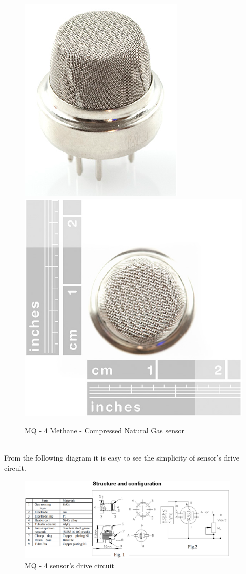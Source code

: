 \documentclass[12pt,a4paper,draft]{report}
\begin{document}
\begin{figure}[H]
\centering
\includegraphics*[scale=0.45]{mq4}
\includegraphics*[scale=0.45]{mq4_2}
\caption{MQ - 4 Methane - Compressed Natural Gas sensor}
\end{figure}
\ \\
%
From the following diagram it is easy to see the simplicity of sensor's drive circuit.
\begin{figure}[H]
\centering
\includegraphics*[width=400px]{mq4_structure-configuration}
\centering
\caption{MQ - 4 sensor's drive circuit}
\end{figure}
\end{document}
